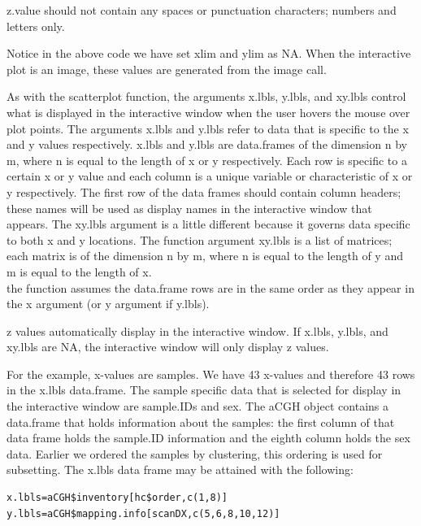 \documentclass[]{article}
\begin{document}
 z.value should not contain any spaces or punctuation characters; numbers and letters only. \newline

\indent Notice in the above code we have set xlim and ylim as NA. When the interactive plot is an image, these values are generated from the image call. 

\indent As with the scatterplot function, the arguments x.lbls, y.lbls, and xy.lbls control what is displayed in the interactive window when the user hovers the mouse over plot points. The arguments x.lbls and y.lbls refer to data that is specific to the x and y values respectively. x.lbls and y.lbls are data.frames of the dimension n by m, where n is equal to the length of x or y respectively. Each row is specific to a certain x or y value and each column is a unique variable or characteristic of x or y respectively.  The first row of the data frames should contain column headers; these names will be used as display names in the interactive window that appears. The xy.lbls argument is a little different because it governs data specific to both x and y locations. The function argument xy.lbls is a list of matrices; each matrix is of the dimension n by m, where n is equal to the length of y and m is equal to the length of x.\\ 

 the function assumes the data.frame rows are in the same order as they appear in the x argument (or y argument if y.lbls).  \newline

 z values automatically display in the interactive window. If x.lbls, y.lbls, and xy.lbls are NA, the interactive window will only display z values. \newline 

\indent For the example, x-values are samples. We have 43 x-values and therefore 43 rows in the x.lbls data.frame. The sample specific data that is selected for display in the interactive window are sample.IDs and sex. The aCGH object contains a data.frame that holds information about the samples: the first column of that data frame holds the sample.ID information and the eighth column holds the sex data. Earlier we ordered the samples by clustering, this ordering is used for subsetting. The x.lbls data frame may be attained with the following:

\begin{verbatim}
x.lbls=aCGH$inventory[hc$order,c(1,8)]
y.lbls=aCGH$mapping.info[scanDX,c(5,6,8,10,12)]
\end{verbatim}
\end{document}
